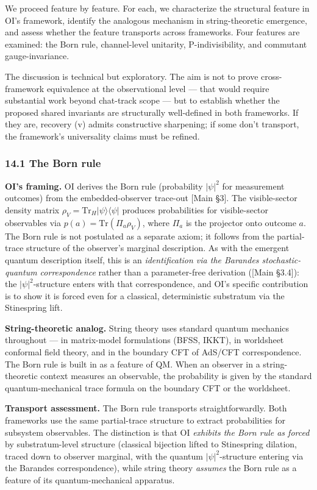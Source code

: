 \documentclass[
]{article}
\begin{document}
We proceed feature by feature. For each, we characterize the structural
feature in OI's framework, identify the analogous mechanism in
string-theoretic emergence, and assess whether the feature transports
across frameworks. Four features are examined: the Born rule,
channel-level unitarity, P-indivisibility, and commutant
gauge-invariance.

The discussion is technical but exploratory. The aim is not to prove
cross-framework equivalence at the observational level --- that would
require substantial work beyond chat-track scope --- but to establish
whether the proposed shared invariants are structurally well-defined in
both frameworks. If they are, recovery (v) admits constructive
sharpening; if some don't transport, the framework's universality claims
must be refined.

\hypertarget{the-born-rule}{%
\subsubsection{14.1 The Born rule}\label{the-born-rule}}

\textbf{OI's framing.} OI derives the Born rule (probability
\(|\psi|^2\) for measurement outcomes) from the embedded-observer
trace-out {[}Main §3{]}. The visible-sector density matrix
\(\rho_V = \text{Tr}_H |\psi\rangle\langle\psi|\) produces probabilities
for visible-sector observables via \(p(a) = \text{Tr}(\Pi_a \rho_V)\),
where \(\Pi_a\) is the projector onto outcome \(a\). The Born rule is
not postulated as a separate axiom; it follows from the partial-trace
structure of the observer's marginal description. As with the emergent
quantum description itself, this is an \emph{identification via the
Barandes stochastic-quantum correspondence} rather than a parameter-free
derivation ({[}Main §3.4{]}): the \(|\psi|^2\)-structure enters with
that correspondence, and OI's specific contribution is to show it is
forced even for a classical, deterministic substratum via the
Stinespring lift.

\textbf{String-theoretic analog.} String theory uses standard quantum
mechanics throughout --- in matrix-model formulations (BFSS, IKKT), in
worldsheet conformal field theory, and in the boundary CFT of AdS/CFT
correspondence. The Born rule is built in as a feature of QM. When an
observer in a string-theoretic context measures an observable, the
probability is given by the standard quantum-mechanical trace formula on
the boundary CFT or the worldsheet.

\textbf{Transport assessment.} The Born rule transports
straightforwardly. Both frameworks use the same partial-trace structure
to extract probabilities for subsystem observables. The distinction is
that OI \emph{exhibits the Born rule as forced} by substratum-level
structure (classical bijection lifted to Stinespring dilation, traced
down to observer marginal, with the quantum \(|\psi|^2\)-structure
entering via the Barandes correspondence), while string theory
\emph{assumes} the Born rule as a feature of its quantum-mechanical
apparatus.
\end{document}
